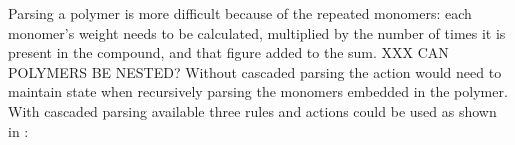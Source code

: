 Parsing a polymer is more difficult because of the repeated monomers: each
monomer's weight needs to be calculated, multiplied by the number of times
it is present in the compound, and that figure added to the sum.  XXX CAN
POLYMERS BE NESTED\@?  Without cascaded parsing the action would need to
maintain state when recursively parsing the monomers embedded in the
polymer.  With cascaded parsing available three rules and actions could be
used as shown in :

\newlength{\regexwidth}
\setlength{\regexwidth}{130pt}
\newlength{\actionwidth}
\setlength{\actionwidth}{\textwidth}
\addtolength{\actionwidth}{-\regexwidth}
\addtolength{\actionwidth}{-30pt}
\addtolength{\actionwidth}{-24pt}
